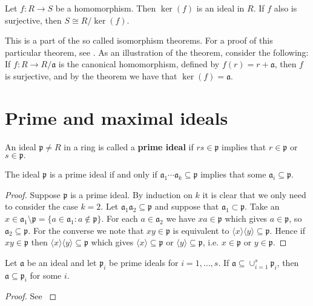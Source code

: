 \documentclass[english,bachelor]{liumaiex}
\begin{document}
\begin{thm}\label{thm:iso}
Let $f\colon R\to S$ be a homomorphism. Then $\ker(f)$ is an ideal in $R$. If $f$ also is surjective, then $S\cong R/\ker(f).$
\end{thm}
This is a part of the so called isomorphism theorems. For a proof of this particular theorem, see \cite[p. 26]{froberg}. As an illustration of the theorem, consider the following: If $f\colon R\to R/\mathfrak{a}$ is the canonical homomorphism, defined by $f(r) = r + \mathfrak{a}$, then $f$ is surjective, and by the theorem we have that $\ker(f)=\mathfrak{a}$.

\section{Prime and maximal ideals}

\begin{define}
An ideal $\mathfrak{p}\neq R$ in a ring is called a \textbf{prime ideal} if $rs\in \mathfrak{p}$ implies that $r\in \mathfrak{p}$ or $s\in \mathfrak{p}.$
\end{define}
\begin{lem}
The ideal $\mathfrak{p}$ is a prime ideal if and only if $\mathfrak{a}_1\cdots\mathfrak{a}_k\subseteq\mathfrak{p}$ implies that some $\mathfrak{a}_i\subseteq\mathfrak{p}.$
\end{lem}
\begin{proof}
Suppose $\mathfrak{p}$ is a prime ideal. By induction on $k$ it is clear that we only need to consider the case $k=2$. Let $\mathfrak{a}_1\mathfrak{a}_2\subseteq\mathfrak{p}$ and suppose that $\mathfrak{a}_1\subset\mathfrak{p}.$ Take an $x\in\mathfrak{a}_1\setminus \mathfrak{p} = \{a\in\mathfrak{a}_1 : a\notin\mathfrak{p}\}.$ For each $a\in\mathfrak{a}_2$ we have $xa\in\mathfrak{p}$ which gives $a\in\mathfrak{p}$, so $\mathfrak{a}_2\subseteq\mathfrak{p}.$ \newline 
For the converse we note that $xy\in\mathfrak{p}$ is equivalent to $\langle x \rangle \langle y \rangle \subseteq \mathfrak{p}.$ Hence if $xy\in\mathfrak{p}$ then $\langle x \rangle \langle y \rangle \subseteq \mathfrak{p}$ which gives $\langle x \rangle \subseteq\mathfrak{p}$ or $\langle y \rangle \subseteq \mathfrak{p}$, i.e. $x\in\mathfrak{p}$ or $y\in\mathfrak{p}.$
\end{proof}

\begin{lem}
Let $\mathfrak{a}$ be an ideal and let $\mathfrak{p}_i$ be prime ideals for $i=1,\dots,s.$ If $\mathfrak{a}\subseteq\cup_{i=1}^s \mathfrak{p}_i$, then $\mathfrak{a}\subseteq\mathfrak{p}_i$ for some $i$.
\end{lem}
\begin{proof}
See \cite[p. 29]{froberg}
\end{proof}
\end{document}
